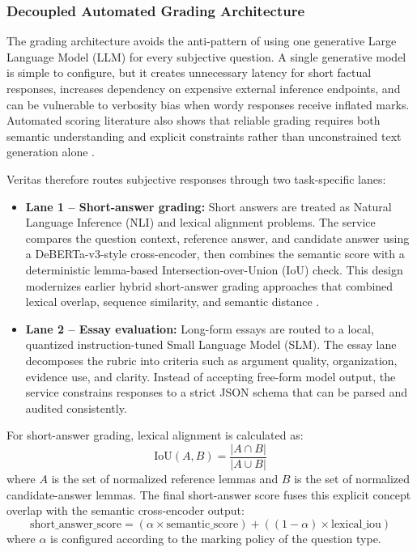 \subsubsection{Decoupled Automated Grading Architecture}
The grading architecture avoids the anti-pattern of using one generative Large Language Model (LLM) for every subjective question. A single generative model is simple to configure, but it creates unnecessary latency for short factual responses, increases dependency on expensive external inference endpoints, and can be vulnerable to verbosity bias when wordy responses receive inflated marks. Automated scoring literature also shows that reliable grading requires both semantic understanding and explicit constraints rather than unconstrained text generation alone \citep{BenOmranAbAziz2013,Haller2022,Ramesh2022}.

Veritas therefore routes subjective responses through two task-specific lanes:
\begin{itemize}
    \item \textbf{Lane 1 -- Short-answer grading:} Short answers are treated as Natural Language Inference (NLI) and lexical alignment problems. The service compares the question context, reference answer, and candidate answer using a DeBERTa-v3-style cross-encoder, then combines the semantic score with a deterministic lemma-based Intersection-over-Union (IoU) check. This design modernizes earlier hybrid short-answer grading approaches that combined lexical overlap, sequence similarity, and semantic distance \citep{BenOmranAbAziz2013,He2023}.
    \item \textbf{Lane 2 -- Essay evaluation:} Long-form essays are routed to a local, quantized instruction-tuned Small Language Model (SLM). The essay lane decomposes the rubric into criteria such as argument quality, organization, evidence use, and clarity. Instead of accepting free-form model output, the service constrains responses to a strict JSON schema that can be parsed and audited consistently.
\end{itemize}

For short-answer grading, lexical alignment is calculated as:
\[
\text{IoU}(A,B) = \frac{|A \cap B|}{|A \cup B|}
\]
where \(A\) is the set of normalized reference lemmas and \(B\) is the set of normalized candidate-answer lemmas. The final short-answer score fuses this explicit concept overlap with the semantic cross-encoder output:
\[
\text{short\_answer\_score} =
(\alpha \times \text{semantic\_score}) +
((1-\alpha) \times \text{lexical\_iou})
\]
where \(\alpha\) is configured according to the marking policy of the question type.

